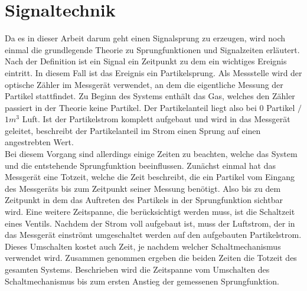 \section{Signaltechnik}
Da es in dieser Arbeit darum geht einen Signalsprung zu erzeugen, wird noch einmal die grundlegende Theorie zu Sprungfunktionen und Signalzeiten erl\"{a}utert. Nach der Definition ist ein Signal ein Zeitpunkt zu dem ein wichtiges Ereignis eintritt. In diesem Fall ist das Ereignis ein Partikelsprung. Als Messstelle wird der optische Z\"{a}hler im Messger\"{a}t verwendet, an dem die eigentliche Messung der Partikel stattfindet. Zu Beginn des Systems enth\"{a}lt das Gas, welches den Z\"{a}hler passiert in der Theorie keine Partikel. Der Partikelanteil liegt also bei \(0\) Partikel \(/\) \(1m^3\) Luft. Ist der Partikelstrom komplett aufgebaut und wird in das Messger\"{a}t geleitet, beschreibt der Partikelanteil im Strom einen Sprung auf einen angestrebten Wert.
\\
Bei diesem Vorgang sind allerdings einige Zeiten zu beachten, welche das System und die entstehende Sprungfunktion beeinflussen. Zun\"{a}chst einmal hat das Messger\"{a}t eine Totzeit, welche die Zeit beschreibt, die ein Partikel vom Eingang des Messger\"{a}ts bis zum Zeitpunkt seiner Messung ben\"{o}tigt. Also bis zu dem Zeitpunkt in dem das Auftreten des Partikels in der Sprungfunktion sichtbar wird. Eine weitere Zeitspanne, die ber\"{u}cksichtigt werden muss, ist die Schaltzeit eines Ventils. Nachdem der Strom voll aufgebaut ist, muss der Luftstrom, der in das Messger\"{a}t einstr\"{o}mt umgeschaltet werden auf den aufgebauten Partikelstrom. Dieses Umschalten kostet auch Zeit, je nachdem welcher Schaltmechanismus verwendet wird. Zusammen genommen ergeben die beiden Zeiten die Totzeit des gesamten Systems. Beschrieben wird die Zeitspanne vom Umschalten des Schaltmechanismus bis zum ersten Anstieg der gemessenen Sprungfunktion.